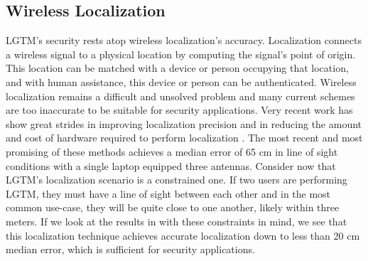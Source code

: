 \documentclass[12pt]{report}
\begin{document}
\subsection{Wireless Localization}
LGTM's security rests atop wireless localization's accuracy. Localization connects a wireless signal to a physical location by computing the signal's point of origin. This location can be matched with a device or person occupying that location, and with human assistance, this device or person can be authenticated. Wireless localization remains a difficult and unsolved problem and many current schemes are too inaccurate to be suitable for security applications. Very recent work has show great strides in improving localization precision and in reducing the amount and cost of hardware required to perform localization \cite{UbicarseKumar2014,SpotFiKotaru2015,ChronosSingleAPLocalizationVasisht2016}. The most recent and most promising of these methods \cite{ChronosSingleAPLocalizationVasisht2016} achieves a median error of 65 cm in line of sight conditions with a single laptop equipped three antennas. Consider now that LGTM's localization scenario is a constrained one. If two users are performing LGTM, they must have a line of sight between each other and in the most common use-case, they will be quite close to one another, likely within three meters. If we look at the results in \cite{ChronosSingleAPLocalizationVasisht2016} with these constraints in mind, we see that this localization technique achieves accurate localization down to less than 20 cm median error, which is sufficient for security applications. \par
\end{document}
